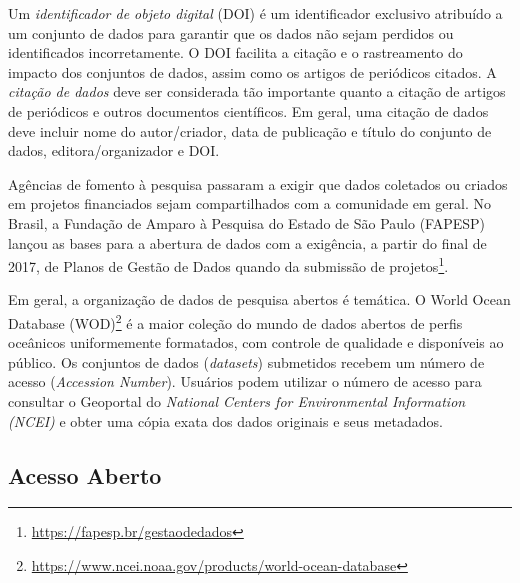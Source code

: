 Um \textit{identificador de objeto digital} (DOI) é um identificador exclusivo atribuído a um conjunto de dados para garantir que os dados não sejam perdidos ou identificados incorretamente.
O DOI facilita a citação e o rastreamento do impacto dos conjuntos de dados, assim como os artigos de periódicos citados.
%
A \textit{citação de dados} deve ser considerada tão importante quanto a citação de artigos de periódicos e outros documentos científicos. 
Em geral, uma citação de dados deve incluir nome do autor/criador, data de publicação e título do conjunto de dados,  editora/organizador e DOI.

Agências de fomento à pesquisa passaram a exigir que dados coletados ou criados em projetos financiados sejam compartilhados com a comunidade em geral.
No Brasil, a Fundação de Amparo à Pesquisa do Estado de São Paulo (FAPESP) lançou as bases para a abertura de dados com a exigência, a partir do final de 2017, de Planos de Gestão de Dados quando da submissão de projetos\footnote{\url{https://fapesp.br/gestaodedados}}.


Em geral, a organização de dados de pesquisa abertos é temática. 
O World Ocean Database (WOD)\footnote{\url{https://www.ncei.noaa.gov/products/world-ocean-database}} é a maior coleção do mundo de dados abertos de perfis oceânicos uniformemente formatados, com controle de qualidade e disponíveis ao público. Os conjuntos de dados (\textit{datasets}) submetidos recebem um número de acesso (\textit{Accession Number}). Usuários podem utilizar o número de acesso para consultar o Geoportal do \textit{National Centers for Environmental Information (NCEI)} e obter uma cópia exata dos dados originais e seus metadados.


\subsection{Acesso Aberto}

